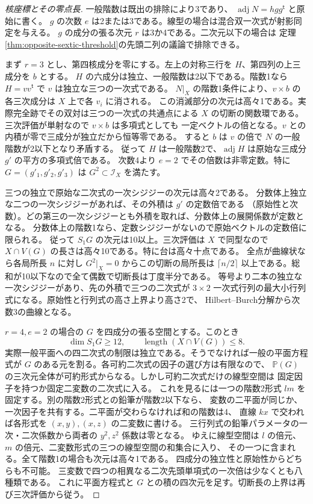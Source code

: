 \begin{proof}[核座標とその零点長]
一般階数は既出の排除により3であり、
$\operatorname{adj}N=hgg^{\mathsf t}$ と原始に書く。
$g$ の次数 $e$ は2または3である。線型の場合は混合双一次式が射影同定を与える。
$g$ の成分の張る次元 $r$ は3か4である。二次元以下の場合は
定理\ref{thm:opposite-sextic-threshold}の先頭二列の議論で排除できる。

まず $r=3$ とし、第四核成分を零にする。左上の対称三行を $H$、第四列の上三成分を $b$ とする。
$H$ の六成分は独立、一般階数は2以下である。階数1なら
$H=vv^{\mathsf t}$ で $v$ は独立な三つの一次式である。
$N|_X$ の階数1条件により、$v\times b$ の各三次成分は $X$ 上で各 $v_i$ に消される。
この消滅部分の次元は高々1である。実際完全跡でその双対は三つの一次式の共通点による
$X$ の切断の関数環である。三次評価が単射なので $v\times b$ は多項式としても
一定ベクトルの倍となる。$v$ との内積が零で三成分が独立だから恒等零である。
すると $b$ は $v$ の倍で $N$ の一般階数が2以下となり矛盾する。
従って $H$ は一般階数2で、$\operatorname{adj}H$ は原始な三成分 $g'$ の平方の多項式倍である。
次数4より $e=2$ でその倍数は非零定数。特に $G=(g'_1,g'_2,g'_3)$ は
$G^2\subset\mathcal I_X$ を満たす。

三つの独立で原始な二次式の一次シジジーの次元は高々2である。
分数体上独立な二つの一次シジジーがあれば、その外積は $g'$ の定数倍である
（原始性と次数）。どの第三の一次シジジーとも外積を取れば、分数体上の展開係数が定数となる。
分数体上の階数1なら、定数シジジーがないので原始ベクトルの定数倍に限られる。
従って $S_1G$ の次元は10以上。三次評価は $X$ で同型なので
$X\cap V(G)$ の長さは高々10である。特に台は高々十点である。
全点が曲線状なら各局所長 $n$ に対し $G^2|_X=0$ からこの切断の局所長は
$\lceil n/2\rceil$ 以上である。総和が10以下なので全て偶数で切断長は丁度半分である。
等号より二本の独立な一次シジジーがあり、先の外積で三つの二次式が
$3\times2$ 一次式行列の最大小行列式になる。原始性と行列式の高さ上界より高さ2で、
Hilbert--Burch分解から次数3の曲線となる。

$r=4,e=2$ の場合の $G$ を四成分の張る空間とする。このとき
\[
              \dim S_1G\ge12,\qquad \operatorname{length}(X\cap V(G))\le8 .
\]
実際一般平面への四二次式の制限は独立である。そうでなければ一般の平面方程式が
$G$ のある元を割る。各可約二次式の因子の選び方は有限なので、
$\mathbb P(G)$ の三次元全体が可約形式からなる。しかし可約二次式だけの線型空間は
固定因子を持つか固定二変数の二次式に入る。
これを見るには一つの階数2形式 $lm$ を固定する。別の階数2形式との鉛筆が階数2以下なら、
変数の二平面が同じか、一次因子を共有する。二平面が交わらなければ和の階数は4、
直線 $kx$ で交われば各形式を $(x,y),(x,z)$ の二変数に書ける。
三行列式の鉛筆パラメータの一次・二次係数から両者の $y^2,z^2$ 係数は零となる。
ゆえに線型空間は $l$ の倍元、$m$ の倍元、二変数形式の三つの線型空間の和集合に入り、
その一つに含まれる。全て階数1の場合も次元は高々1である。
四成分の独立性と原始性からどちらも不可能。
三変数で四つの相異なる二次先頭単項式の一次倍は少なくとも八種類である。
これに平面方程式と $G$ との積の四次元を足す。切断長の上界は再び三次評価から従う。


\end{proof}
